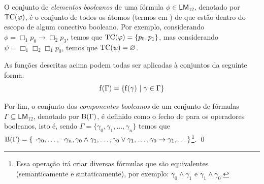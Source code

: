 \begin{definicao}
                O conjunto de \textit{elementos booleanos} de uma fórmula \(\phi \in \mathsf{LM}_{12}\), denotado por \(\operatorname{TC}(\varphi)\), é o conjunto de todos os átomos
                (termos em ) de \PHI que estão dentro do escopo de algum conectivo booleano. Por exemplo, considerando \(\phi = \Box_1 p_0 \to \Box_2 p_3\),
                temos que \(\operatorname{TC}(\varphi) = \{p_0, p_1\}\), mas considerando \(\psi = \Box_1 \Box_2 \Box_1 p_0\), temos que \(\operatorname{TC}(\psi) = \varnothing\).

                As funções descritas acima podem todas ser aplicadas à conjuntos da seguinte forma:
                \[
                    \operatorname{f}(\Gamma) = \{\operatorname{f}(\gamma) \ | \ \gamma \in \Gamma\}
                \]

                Por fim, o conjunto dos \textit{componentes booleanos} de um conjunto de fórmulas \(\Gamma \subseteq \mathsf{LM}_{12}\), denotado por \(\operatorname{B}(\Gamma)\),
                é definido como o fecho de \GAMMA para os operadores booleanos, isto é, sendo \(\Gamma = \{\gamma_0, \gamma_1, \dots, \gamma_n\}\) temos que
                \(\operatorname{B}(\Gamma) = \{\neg\gamma_0, \dots, \neg \gamma_n, \gamma_0 \land \gamma_1, \dots, \gamma_0 \lor \gamma_1, \dots, \gamma_0 \to \gamma_1, \dots\}
                \)\footnote{Essa operação irá criar diversas fórmulas que são equivalentes (semanticamente e sintaticamente), por exemplo:
                \(\gamma_0 \land \gamma_1\) e \(\gamma_1 \land \gamma_0\).}. \qed
            \end{definicao}

